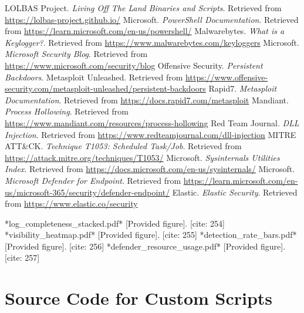 \documentclass[11pt]{article}
\begin{document}
\begin{thebibliography}{99}
		 LOLBAS Project. \textit{Living Off The Land Binaries and Scripts}. Retrieved from \url{https://lolbas-project.github.io/}
		 Microsoft. \textit{PowerShell Documentation}. Retrieved from \url{https://learn.microsoft.com/en-us/powershell/}
		 Malwarebytes. \textit{What is a Keylogger?}. Retrieved from \url{https://www.malwarebytes.com/keyloggers}
		 Microsoft. \textit{Microsoft Security Blog}. Retrieved from \url{https://www.microsoft.com/security/blog}
		 Offensive Security. \textit{Persistent Backdoors}. Metasploit Unleashed. Retrieved from \url{https://www.offensive-security.com/metasploit-unleashed/persistent-backdoors}
		 Rapid7. \textit{Metasploit Documentation}. Retrieved from \url{https://docs.rapid7.com/metasploit}
		 Mandiant. \textit{Process Hollowing}. Retrieved from \url{https://www.mandiant.com/resources/process-hollowing} %
		 Red Team Journal. \textit{DLL Injection}. Retrieved from \url{https://www.redteamjournal.com/dll-injection} %
		 MITRE ATT\&CK. \textit{Technique T1053: Scheduled Task/Job}. Retrieved from \url{https://attack.mitre.org/techniques/T1053/}
		 Microsoft. \textit{Sysinternals Utilities Index}. Retrieved from \url{https://docs.microsoft.com/en-us/sysinternals/}
		 Microsoft. \textit{Microsoft Defender for Endpoint}. Retrieved from \url{https://learn.microsoft.com/en-us/microsoft-365/security/defender-endpoint/}
		 Elastic. \textit{Elastic Security}. Retrieved from \url{https://www.elastic.co/security}
		
		 *log_completeness_stacked.pdf* [Provided figure]. [cite: 254]
		 *visibility_heatmap.pdf* [Provided figure]. [cite: 255]
		 *detection_rate_bars.pdf* [Provided figure]. [cite: 256]
		 *defender_resource_usage.pdf* [Provided figure]. [cite: 257]
		
	\end{thebibliography}
	\newpage
	
	\appendix
	\section{Source Code for Custom Scripts}
\end{document}
